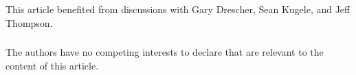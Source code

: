 \documentclass[runningheads]{llncs}
\begin{document}






\begin{credits}
\subsubsection{\ackname}
This article benefited from discussions with Gary Drescher, Sean Kugele, and Jeff Thompson.

\subsubsection{\discintname}
The authors have no competing interests to declare that are
relevant to the content of this article.
\end{credits}
%
%
%


%
\end{document}
